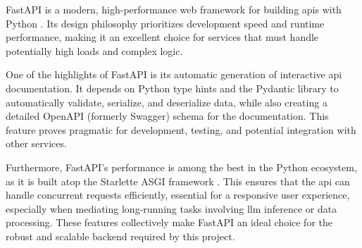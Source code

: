 FastAPI is a modern, high-performance web framework for building \acp{api} with Python \cite{FASTAPI}. Its design philosophy prioritizes development speed and runtime performance, making it an excellent choice for services that must handle potentially high loads and complex logic.

One of the highlights of FastAPI is its automatic generation of interactive \acs{api} documentation. It depends on Python type hints and the Pydantic library to automatically validate, serialize, and deserialize data, while also creating a detailed OpenAPI (formerly Swagger) schema for the documentation. This feature proves pragmatic for development, testing, and potential integration with other services.

Furthermore, FastAPI's performance is among the best in the Python ecosystem, as it is built atop the Starlette ASGI framework \cite{STARLETTE}. This ensures that the \acs{api} can handle concurrent requests efficiently, essential for a responsive user experience, especially when mediating long-running tasks involving \ac{llm} inference or data processing. These features collectively make FastAPI an ideal choice for the robust and scalable backend required by this project.